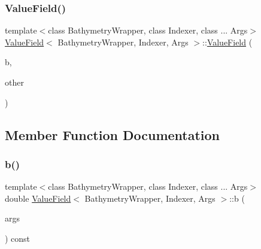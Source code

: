 \subsubsection{\texorpdfstring{Value\+Field()}{ValueField()}\hspace{0.1cm}{\footnotesize\ttfamily [3/3]}}
{\footnotesize\ttfamily template$<$class Bathymetry\+Wrapper, class Indexer, class ... Args$>$ \\
\hyperlink{structValueField}{Value\+Field}$<$ Bathymetry\+Wrapper, Indexer, Args $>$\+::\hyperlink{structValueField}{Value\+Field} (\begin{DoxyParamCaption}\item[{const \hyperlink{structBathymetry}{Bathymetry} \&}]{b,  }\item[{\hyperlink{structBaseValueField}{Base\+Value\+Field}$<$ Bathymetry\+Wrapper, Indexer, Args $>$ \&\&}]{other }\end{DoxyParamCaption})\hspace{0.3cm}{\ttfamily [inline]}}



\subsection{Member Function Documentation}
\mbox{\label{structValueField_a33f345a79bcb21fee59cd56de29cd901}} 
\subsubsection{\texorpdfstring{b()}{b()}}
{\footnotesize\ttfamily template$<$class Bathymetry\+Wrapper, class Indexer, class ... Args$>$ \\
double \hyperlink{structValueField}{Value\+Field}$<$ Bathymetry\+Wrapper, Indexer, Args $>$\+::b (\begin{DoxyParamCaption}\item[{Args...}]{args }\end{DoxyParamCaption}) const\hspace{0.3cm}{\ttfamily [inline]}}

\mbox{\label{structValueField_acb7a0272b71871ba858e9862d64ba8c7}} 
